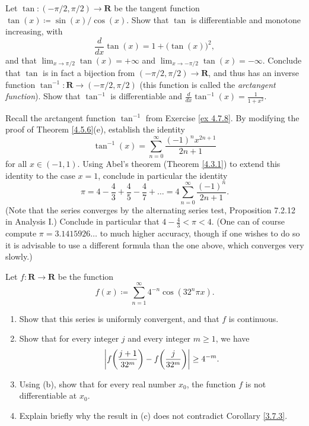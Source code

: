 \begin{exercise}\label{ex 4.7.8}
    Let \(\tan : (- \pi / 2, \pi / 2) \to \mathbf{R}\) be the tangent function \(\tan(x) \coloneqq \sin(x) / \cos(x)\).
    Show that \(\tan\) is differentiable and monotone increasing, with
    \[
        \frac{d}{dx} \tan(x) = 1 + \big(\tan(x)\big)^2,
    \]
    and that \(\lim_{x \to \pi / 2} \tan(x) = +\infty\) and \(\lim_{x \to -\pi / 2} \tan(x) = -\infty\).
    Conclude that \(\tan\) is in fact a bijection from \((- \pi / 2, \pi / 2) \to \mathbf{R}\), and thus has an inverse function \(\tan^{-1} : \mathbf{R} \to (- \pi / 2, \pi / 2)\)
    (this function is called the \emph{arctangent function}).
    Show that \(\tan^{-1}\) is differentiable and \(\frac{d}{dx} \tan^{-1}(x) = \frac{1}{1 + x^2}\).
\end{exercise}

\begin{exercise}\label{ex 4.7.9}
    Recall the arctangent function \(\tan^{-1}\) from Exercise \ref{ex 4.7.8}.
    By modifying the proof of Theorem \ref{4.5.6}(e), establish the identity
    \[
        \tan^{-1}(x) = \sum_{n = 0}^\infty \frac{(-1)^n x^{2n + 1}}{2n + 1}
    \]
    for all \(x \in (-1, 1)\).
    Using Abel's theorem (Theorem \ref{4.3.1}) to extend this identity to the case \(x = 1\), conclude in particular the identity
    \[
        \pi = 4 - \frac{4}{3} + \frac{4}{5} - \frac{4}{7} + \dots = 4 \sum_{n = 0}^\infty \frac{(-1)^n}{2n + 1}.
    \]
    (Note that the series converges by the alternating series test, Proposition 7.2.12 in Analysis I.)
    Conclude in particular that \(4 - \frac{4}{3} < \pi < 4\).
    (One can of course compute \(\pi = 3.1415926 \dots\) to much higher accuracy, though if one wishes to do so it is advisable to use a different formula than the one above, which converges very slowly.)
\end{exercise}

\begin{exercise}\label{ex 4.7.10}
    Let \(f : \mathbf{R} \to \mathbf{R}\) be the function
    \[
        f(x) \coloneqq \sum_{n = 1}^\infty 4^{-n} \cos(32^n \pi x).
    \]
    \begin{enumerate}
        \item Show that this series is uniformly convergent, and that \(f\) is continuous.
        \item Show that for every integer \(j\) and every integer \(m \geq 1\), we have
              \[
                  \abs*{f\bigg(\frac{j + 1}{32^m}\bigg) - f\bigg(\frac{j}{32^m}\bigg)} \geq 4^{-m}.
              \]
        \item Using (b), show that for every real number \(x_0\), the function \(f\) is not differentiable at \(x_0\).
        \item Explain briefly why the result in (c) does not contradict Corollary \ref{3.7.3}.
    \end{enumerate}
\end{exercise}